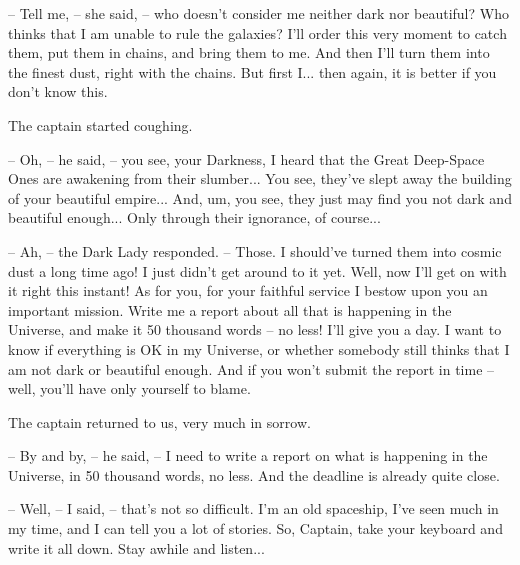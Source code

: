 \documentclass[ebook,oneside,final,openright]{memoir}
\begin{document}
– Tell me, – she said, – who doesn’t consider me neither dark nor beautiful? Who thinks that I am unable to rule the galaxies? I’ll order this very moment to catch them, put them in chains, and bring them to me. And then I’ll turn them into the finest dust, right with the chains. But first I... then again, it is better if you don’t know this.\par
The captain started coughing.\par
– Oh, – he said, – you see, your Darkness, I heard that the Great Deep-Space Ones are awakening from their slumber... You see, they’ve slept away the building of your beautiful empire... And, um, you see, they just may find you not dark and beautiful enough... Only through their ignorance, of course...\par
– Ah, – the Dark Lady responded. – Those. I should’ve turned them into cosmic dust a long time ago! I just didn’t get around to it yet. Well, now I’ll get on with it right this instant! As for you, for your faithful service I bestow upon you an important mission. Write me a report about all that is happening in the Universe, and make it 50 thousand words – no less! I’ll give you a day. I want to know if everything is OK in my Universe, or whether somebody still thinks that I am not dark or beautiful enough. And if you won’t submit the report in time – well, you’ll have only yourself to blame.\par
\par
The captain returned to us, very much in sorrow.\par
– By and by, – he said, – I need to write a report on what is happening in the Universe, in 50 thousand words, no less. And the deadline is already quite close.\par
– Well, – I said, – that’s not so difficult. I’m an old spaceship, I’ve seen much in my time, and I can tell you a lot of stories. So, Captain, take your keyboard and write it all down. Stay awhile and listen...
\end{document}
